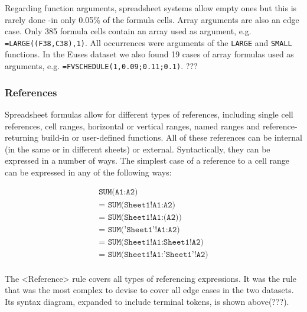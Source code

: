 \documentclass[conference]{IEEEtran}
\begin{document}
Regarding function arguments, spreadsheet systems allow empty ones but this is rarely done -in only 0.05\% of the formula cells. Array arguments are also an edge case. Only 385 formula cells contain an array used as argument, e.g. \texttt{=LARGE((F38,C38),1)}. All occurrences were arguments of the \texttt{LARGE} and \texttt{SMALL} functions. In the Euses dataset we also found 19 cases of array formulas used as arguments, e.g. \texttt{=FVSCHEDULE(1,{0.09;0.11;0.1})}. ???

\subsubsection{References}
 
Spreadsheet formulas allow for different types of references, including single cell references, cell ranges, horizontal or vertical ranges, named ranges and reference-returning build-in or user-defined functions. All of these references can be internal (in the same or in different sheets) or external. Syntactically, they can be expressed in a number of ways. The simplest case of a reference to a cell range can be expressed in any of the following ways:

\begin{eqnarray*}
\texttt{SUM(A1:A2)} \\ 
\texttt{= SUM(Sheet1!A1:A2)} \\
\texttt{= SUM(Sheet1!A1:(A2))} \\
\texttt{= SUM('Sheet1'!A1:A2)} \\
\texttt{= SUM(Sheet1!A1:Sheet1!A2)} \\
\texttt{= SUM(Sheet1!A1:'Sheet1'!A2)} \\
\end{eqnarray*}

The <Reference> rule covers all types of referencing expressions. It was the rule that was the most complex to devise to cover all edge cases in the two datasets. Its syntax diagram, expanded to include terminal tokens, is shown above(???).
\end{document}
